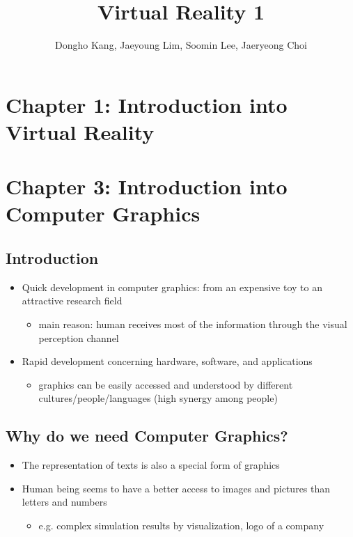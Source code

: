 \documentclass[12pt]{article}
\title{Virtual Reality 1}
\author{Dongho Kang, Jaeyoung Lim, Soomin Lee, Jaeryeong Choi}
\begin{document}
 

\maketitle

\section{Chapter 1: Introduction into Virtual Reality}


\newpage
\section{Chapter 3: Introduction into Computer Graphics}

\subsection{Introduction}

\begin{itemize}
	\item Quick development in computer graphics: from an expensive toy to an attractive research field
		\begin{itemize}
			\item main reason: human receives most of the information through the visual perception channel
			\end{itemize}
	\item Rapid development concerning hardware, software, and applications
		\begin{itemize}
			\item graphics can be easily accessed and understood by different cultures/people/languages (high synergy among people)
		\end{itemize}
\end{itemize}

\subsection{Why do we need Computer Graphics?}

\begin{itemize}
	\item The representation of texts is also a special form of graphics
	\item Human being seems to have a better access to images and pictures than letters and numbers
		\begin{itemize}
			\item e.g. complex simulation results by visualization, logo of a company
		\end{itemize}
\end{itemize}
\end{document}
